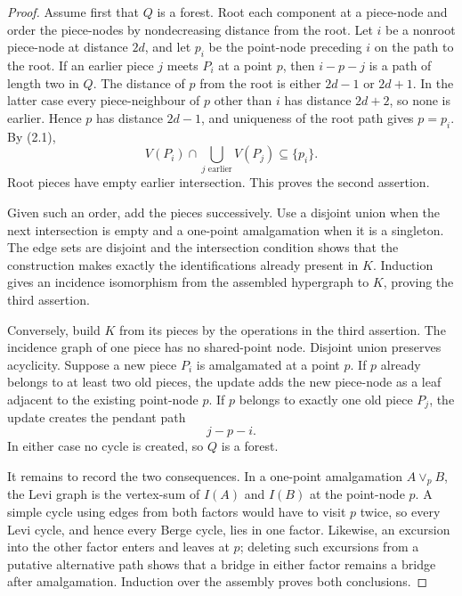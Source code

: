 \begin{proof}
Assume first that $Q$ is a forest.  Root each component at a piece-node and
order the piece-nodes by nondecreasing distance from the root.  Let $i$ be a
nonroot piece-node at distance $2d$, and let $p_i$ be the point-node preceding
$i$ on the path to the root.  If an earlier piece $j$ meets $P_i$ at a point
$p$, then $i-p-j$ is a path of length two in $Q$.  The distance of $p$ from the
root is either $2d-1$ or $2d+1$.  In the latter case every piece-neighbour of
$p$ other than $i$ has distance $2d+2$, so none is earlier.  Hence $p$ has
distance $2d-1$, and uniqueness of the root path gives $p=p_i$.  By (2.1),
\[
 V(P_i)\cap\bigcup_{j\text{ earlier}}V(P_j)\subseteq\{p_i\}.
\]
Root pieces have empty earlier intersection.  This proves the second assertion.

Given such an order, add the pieces successively.  Use a disjoint union when
the next intersection is empty and a one-point amalgamation when it is a
singleton.  The edge sets are disjoint and the intersection condition shows
that the construction makes exactly the identifications already present in
$K$.  Induction gives an incidence isomorphism from the assembled hypergraph to
$K$, proving the third assertion.

Conversely, build $K$ from its pieces by the operations in the third assertion.
The incidence graph of one piece has no shared-point node.  Disjoint union
preserves acyclicity.  Suppose a new piece $P_i$ is amalgamated at a point $p$.
If $p$ already belongs to at least two old pieces, the update adds the new
piece-node as a leaf adjacent to the existing point-node $p$.  If $p$ belongs
to exactly one old piece $P_j$, the update creates the pendant path
\[
 j-p-i.
\]
In either case no cycle is created, so $Q$ is a forest.

It remains to record the two consequences.  In a one-point amalgamation
$A\vee_pB$, the Levi graph is the vertex-sum of $I(A)$ and $I(B)$ at the
point-node $p$.  A simple cycle using edges from both factors would have to
visit $p$ twice, so every Levi cycle, and hence every Berge cycle, lies in one
factor.  Likewise, an excursion into the other factor enters and leaves at
$p$; deleting such excursions from a putative alternative path shows that a
bridge in either factor remains a bridge after amalgamation.  Induction over
the assembly proves both conclusions.
\end{proof}

%

